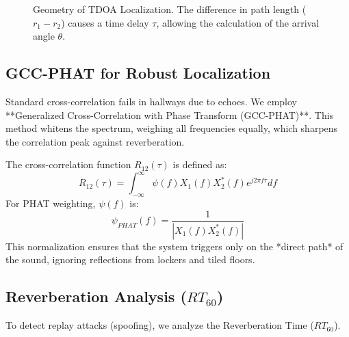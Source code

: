 \documentclass[conference]{IEEEtran}
\begin{document}
\begin{figure}[htbp]
\centering
{}
\caption{Geometry of TDOA Localization. The difference in path length ($r_1 - r_2$) causes a time delay $\tau$, allowing the calculation of the arrival angle $\theta$.}
\label{fig:tdoa}
\end{figure}

\subsection{GCC-PHAT for Robust Localization}
Standard cross-correlation fails in hallways due to echoes. We employ **Generalized Cross-Correlation with Phase Transform (GCC-PHAT)**. This method whitens the spectrum, weighing all frequencies equally, which sharpens the correlation peak against reverberation.

The cross-correlation function $R_{12}(\tau)$ is defined as:
\begin{equation}
R_{12}(\tau) = \int_{-\infty}^{\infty} \psi(f) X_1(f) X_2^*(f) e^{j 2 \pi f \tau} df
\end{equation}
For PHAT weighting, $\psi(f)$ is:
\begin{equation}
\psi_{PHAT}(f) = \frac{1}{|X_1(f) X_2^*(f)|}
\end{equation}
This normalization ensures that the system triggers only on the *direct path* of the sound, ignoring reflections from lockers and tiled floors.

\subsection{Reverberation Analysis ($RT_{60}$)}
To detect replay attacks (spoofing), we analyze the Reverberation Time ($RT_{60}$).
\end{document}
